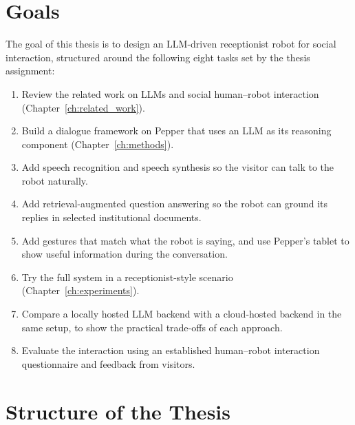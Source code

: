 \section{Goals}
\label{sec:goals}

The goal of this thesis is to design an LLM-driven receptionist robot for social interaction, structured around the following eight tasks set by the thesis assignment:

\begin{enumerate}
    \item Review the related work on LLMs and social human--robot interaction (Chapter~\ref{ch:related_work}).
    \item Build a dialogue framework on Pepper that uses an LLM as its reasoning component (Chapter~\ref{ch:methods}).
    \item Add speech recognition and speech synthesis so the visitor can talk to the robot naturally.
    \item Add retrieval-augmented question answering so the robot can ground its replies in selected institutional documents.
    \item Add gestures that match what the robot is saying, and use Pepper's tablet to show useful information during the conversation.
    \item Try the full system in a receptionist-style scenario (Chapter~\ref{ch:experiments}).
    \item Compare a locally hosted LLM backend with a cloud-hosted backend in the same setup, to show the practical trade-offs of each approach.
    \item Evaluate the interaction using an established human--robot interaction questionnaire and feedback from visitors.
\end{enumerate}

\section{Structure of the Thesis}
\label{sec:thesis_structure}


